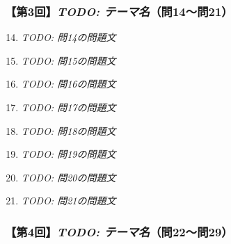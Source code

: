 \documentclass[b4paper,7pt,twocolumn,landscape]{jsarticle}
\begin{document}
\subsubsection*{【第3回】\textit{TODO: テーマ名}（問14〜問21）}

\begin{enumerate}
\setcounter{enumi}{13}
\item \textit{TODO: 問14の問題文}\\

\item \textit{TODO: 問15の問題文}\\

\item \textit{TODO: 問16の問題文}\\

\item \textit{TODO: 問17の問題文}\\

\item \textit{TODO: 問18の問題文}\\

\item \textit{TODO: 問19の問題文}\\

\item \textit{TODO: 問20の問題文}\\

\item \textit{TODO: 問21の問題文}\\
\end{enumerate}

\subsubsection*{【第4回】\textit{TODO: テーマ名}（問22〜問29）}
\end{document}
